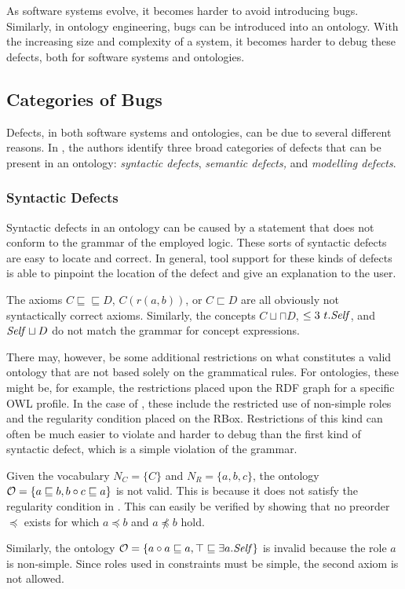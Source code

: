
As software systems evolve, it becomes harder to avoid introducing bugs. Similarly, in ontology engineering, bugs can be introduced into an ontology. With the increasing size and complexity of a system, it becomes harder to debug these defects, both for software systems and ontologies.

\subsection{Categories of Bugs} \label{categories-of-bugs}

Defects, in both software systems and ontologies, can be due to several different reasons. In \cite{kalyanpur2005debugging}, the authors identify three broad categories of defects that can be present in an ontology: \emph{syntactic defects}, \emph{semantic defects,} and \emph{modelling defects}.

\subsubsection{Syntactic Defects} \label{syntactic-defects}

Syntactic defects in an ontology can be caused by a statement that does not conform to the grammar of the employed logic. These sorts of syntactic defects are easy to locate and correct. In general, tool support for these kinds of defects is able to pinpoint the location of the defect and give an explanation to the user.

\begin{example}
  The axioms $C \sqsubseteq \sqsubseteq D$, $C(r(a, b))$, or $C \sqsubset D$ are all obviously not syntactically correct \SROIQ axioms. Similarly, the concepts $C \sqcup \sqcap D$, $\leq 3~t.\mathit{Self}$, and $\mathit{Self} \sqcup D$ do not match the grammar for concept expressions.
\end{example}

There may, however, be some additional restrictions on what constitutes a valid ontology that are not based solely on the grammatical rules. For ontologies, these might be, for example, the restrictions placed upon the RDF graph for a specific OWL profile. In the case of \SROIQ, these include the restricted use of non-simple roles and the regularity condition placed on the RBox. Restrictions of this kind can often be much easier to violate and harder to debug than the first kind of syntactic defect, which is a simple violation of the grammar.

\begin{example}
  Given the vocabulary $N_C = \{ C \}$ and $N_R = \{ a, b, c \}$, the \SROIQ ontology $\mathcal{O} = \{ a \sqsubseteq b, b \circ c \sqsubseteq a \}$ is not valid. This is because it does not satisfy the regularity condition in \SROIQ. This can easily be verified by showing that no preorder $\preceq$ exists for which $a \preceq b$ and $a \not\preceq b$ hold.

  Similarly, the ontology $\mathcal{O} = \{ a \circ a \sqsubseteq a, \top \sqsubseteq \exists a.\mathit{Self} \}$ is invalid because the role $a$ is non-simple. Since roles used in \self constraints must be simple, the second axiom is not allowed.
\end{example}

